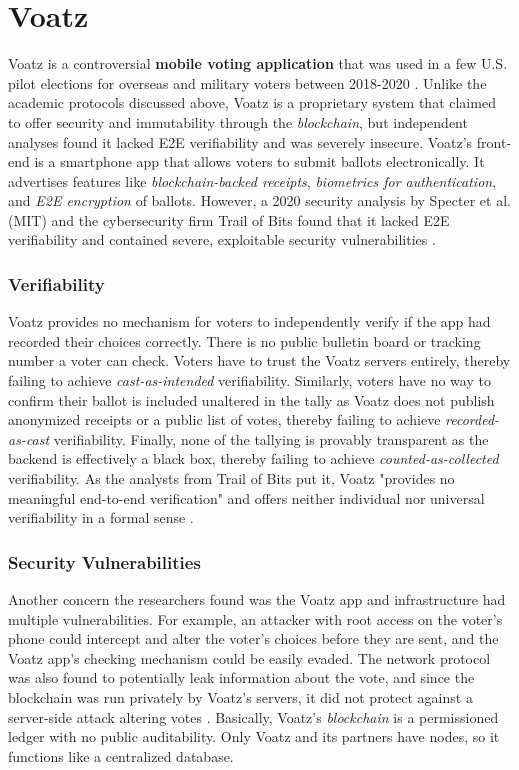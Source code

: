 
\clearpage


\section{Voatz}
Voatz is a controversial \textbf{mobile voting application} that was used in a few U.S. pilot elections for overseas and military voters between 2018-2020 \cite{voatz-mobile-voting-2020}. 
Unlike the academic protocols discussed above, Voatz is a proprietary system that claimed to offer security and immutability through the \emph{blockchain}, but independent analyses found it lacked E2E verifiability and was severely insecure.
Voatz's front-end is a smartphone app that allows voters to submit ballots electronically.
It advertises features like \emph{blockchain-backed receipts}, \emph{biometrics for authentication}, and \emph{E2E encryption} of ballots.
However, a 2020 security analysis by Specter et al. (MIT) and the cybersecurity firm Trail of Bits found that it lacked E2E verifiability and contained severe, exploitable security vulnerabilities \cite{specter2020ballot,guido2020our}.

\subsubsection{Verifiability}
Voatz provides no mechanism for voters to independently verify if the app had recorded their choices correctly.
There is no public bulletin board or tracking number a voter can check. 
Voters have to trust the Voatz servers entirely, thereby failing to achieve \emph{cast-as-intended} verifiability.
Similarly, voters have no way to confirm their ballot is included unaltered in the tally as Voatz does not publish anonymized receipts or a public list of votes, thereby failing to achieve \emph{recorded-as-cast} verifiability.
Finally, none of the tallying is provably transparent as the backend is effectively a black box, thereby failing to achieve \emph{counted-as-collected} verifiability.
As the analysts from Trail of Bits put it, Voatz "provides no meaningful end-to-end verification" and offers neither individual nor universal verifiability in a formal sense \cite{trailofbits-voatz-2020}.


\subsubsection{Security Vulnerabilities}
Another concern the researchers found was the Voatz app and infrastructure had multiple vulnerabilities. 
For example, an attacker with root access on the voter's phone could intercept and alter the voter's choices before they are sent, and the Voatz app's checking mechanism could be easily evaded. 
The network protocol was also found to potentially leak information about the vote, and since the blockchain was run privately by Voatz's servers, it did not protect against a server-side attack altering votes \cite{statescoop-voatz-audit-2020}. 
Basically, Voatz's \emph{blockchain} is a permissioned ledger with no public auditability.
Only Voatz and its partners have nodes, so it functions like a centralized database. 

